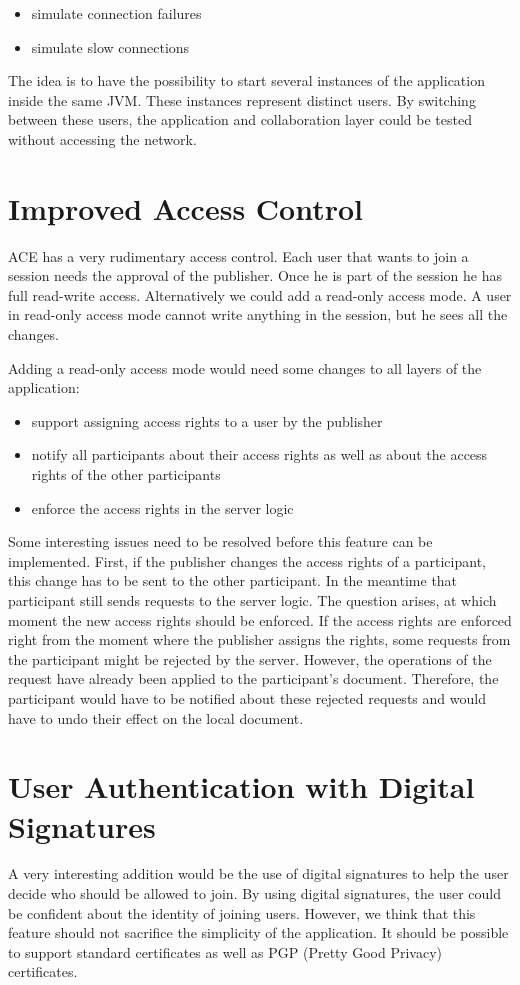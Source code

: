 \begin{itemize}
 \item simulate connection failures
 \item simulate slow connections
\end{itemize}

The idea is to have the possibility to start several instances of the
application inside the same JVM. These instances represent distinct users.
By switching between these users, the application and collaboration layer
could be tested without accessing the network.



\section{Improved Access Control}
ACE has a very rudimentary access control. Each user that wants to join a
session needs the approval of the publisher. Once he is part of the session
he has full read-write access. Alternatively we could add a read-only
access mode. A user in read-only access mode cannot write anything in
the session, but he sees all the changes.

Adding a read-only access mode would need some changes to all layers of
the application:

\begin{itemize}
 \item support assigning access rights to a user by the publisher
 \item notify all participants about their access rights as well as about
       the access rights of the other participants
 \item enforce the access rights in the server logic
\end{itemize}

Some interesting issues need to be resolved before this feature can be
implemented. First, if the publisher changes the access rights of a 
participant, this change has to be sent to the other participant. In the
meantime that participant still sends requests to the server logic. The
question arises, at which moment the new access rights should be enforced.
If the access rights are enforced right from the moment where the publisher
assigns the rights, some requests from the participant might be rejected by the 
server. However, the operations of the request have already been applied
to the participant's document. Therefore, the participant would have to
be notified about these rejected requests and would have to undo their
effect on the local document.



\section{User Authentication with Digital Signatures}
A very interesting addition would be the use of digital signatures to help
the user decide who should be allowed to join. By using digital
signatures, the user could be confident about the identity of joining users.
However, we think that this feature should not sacrifice the simplicity
of the application. It should be possible to support standard certificates
as well as PGP (Pretty Good Privacy) certificates.

